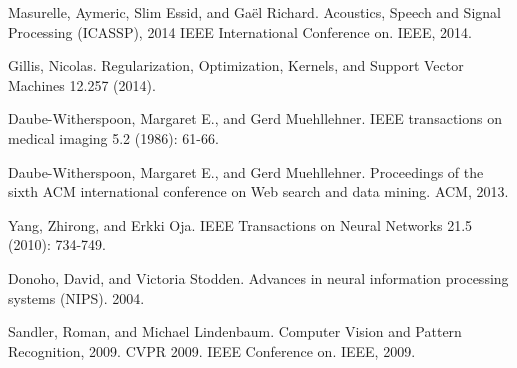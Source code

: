\documentclass[11pt]{article}
\begin{document}
\begin{thebibliography}{}
Masurelle, Aymeric, Slim Essid, and Gaël Richard.
\newblock Acoustics, Speech and Signal Processing (ICASSP), 2014 IEEE International Conference on. IEEE, 2014.

Gillis, Nicolas.
\newblock Regularization, Optimization, Kernels, and Support Vector Machines 12.257 (2014).

Daube-Witherspoon, Margaret E., and Gerd Muehllehner.
\newblock IEEE transactions on medical imaging 5.2 (1986): 61-66.

Daube-Witherspoon, Margaret E., and Gerd Muehllehner.
\newblock Proceedings of the sixth ACM international conference on Web search and data mining. ACM, 2013.

Yang, Zhirong, and Erkki Oja.
\newblock IEEE Transactions on Neural Networks 21.5 (2010): 734-749.

Donoho, David, and Victoria Stodden.
\newblock Advances in neural information processing systems (NIPS). 2004.

Sandler, Roman, and Michael Lindenbaum.
\newblock Computer Vision and Pattern Recognition, 2009. CVPR 2009. IEEE Conference on. IEEE, 2009.


\end{thebibliography}
\end{document}
